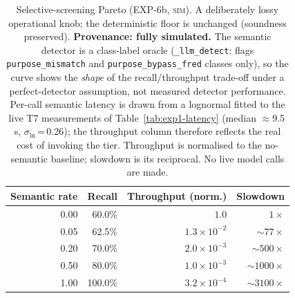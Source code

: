 \begin{table}[t]
\centering
\small
\caption{Selective-screening Pareto (EXP-6b, \textsc{sim}).
  A deliberately lossy operational knob; the deterministic floor is
  unchanged (soundness preserved).
  \textbf{Provenance: fully simulated.}
  The semantic detector is a class-label oracle
  (\texttt{\_llm\_detect}: flags \texttt{purpose\_mismatch} and
  \texttt{purpose\_bypass\_fred} classes only), so the curve shows
  the \emph{shape} of the recall/throughput trade-off under a
  perfect-detector assumption, not measured detector performance.
  Per-call semantic latency is drawn from a lognormal fitted to the
  live T7 measurements of Table~\ref{tab:exp1-latency}
  (median $\approx$9.5\,s, $\sigma_{\ln}$\,=\,0.26);
  the throughput column therefore reflects the real cost of invoking
  the tier.
  Throughput is normalised to the no-semantic baseline;
  slowdown is its reciprocal.
  No live model calls are made.}
\label{tab:exp6b-pareto}
\begin{tabular}{rrrr}
\hline
\textbf{Semantic rate} & \textbf{Recall} & \textbf{Throughput (norm.)} & \textbf{Slowdown} \\
\hline
0.00 & 60.0\%  & $1.0$                & $1\times$          \\
0.05 & 62.5\%  & $1.3\times10^{-2}$   & ${\sim}77\times$   \\
0.20 & 70.0\%  & $2.0\times10^{-3}$   & ${\sim}500\times$  \\
0.50 & 80.0\%  & $1.0\times10^{-3}$   & ${\sim}1000\times$ \\
1.00 & 100.0\% & $3.2\times10^{-4}$   & ${\sim}3100\times$ \\
\hline
\end{tabular}
\end{table}

